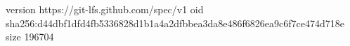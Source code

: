 version https://git-lfs.github.com/spec/v1
oid sha256:d44dbf1dfd4fb5336828d1b1a4a2dfbbea3da8e486f6826ea9c6f7ce474d718e
size 196704
